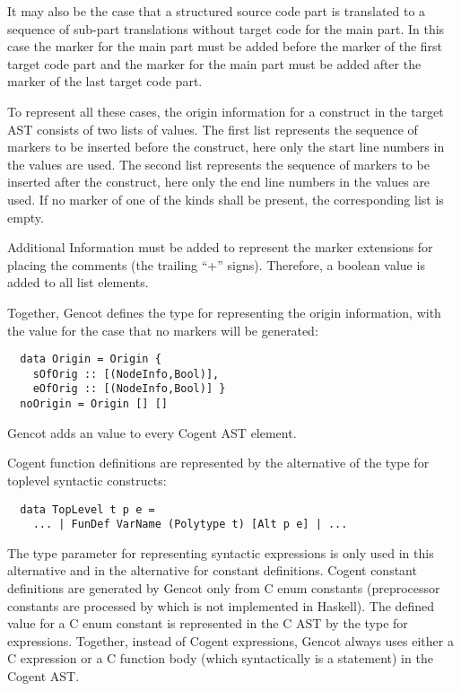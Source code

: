 It may also be the case that a structured source code part is translated to a sequence of sub-part translations without target
code for the main part. In this case the  marker for the main part must be added before the  
marker of the first target code part and the  marker for the main part must be added after the  
marker of the last target code part. 

To represent all these cases, the origin information for a construct in the target AST consists of two lists of 
values. The first list represents the sequence of  markers to be inserted before the construct, here only the
start line numbers in the  values are used. The second list represents the sequence of  markers 
to be inserted after the construct, here only the end line numbers in the  values are used. If no marker of
one of the kinds shall be present, the corresponding list is empty.

Additional Information must be added to represent the marker extensions for placing the comments (the trailing ``+'' signs).
Therefore, a boolean value is added to all list elements.

Together, Gencot defines the type  for representing the origin information, with the value 
for the case that no markers will be generated:
\begin{verbatim}
  data Origin = Origin { 
    sOfOrig :: [(NodeInfo,Bool)], 
    eOfOrig :: [(NodeInfo,Bool)] } 
  noOrigin = Origin [] []
\end{verbatim}
Gencot adds an  value to every Cogent AST element.

Cogent function definitions are represented by the  alternative of the type for toplevel syntactic constructs:

\begin{verbatim}
  data TopLevel t p e = 
    ... | FunDef VarName (Polytype t) [Alt p e] | ...
\end{verbatim}
The type parameter  for representing syntactic expressions is only used in this alternative and in the alternative
for constant definitions. Cogent constant definitions are generated by Gencot only from C enum constants (preprocessor
constants are processed by  which is not implemented in Haskell). The defined value for a C enum
constant is represented in the C AST by the type for expressions. Together, instead of Cogent expressions, Gencot always
uses either a C expression or a C function body (which syntactically is a statement) in the Cogent AST. 

